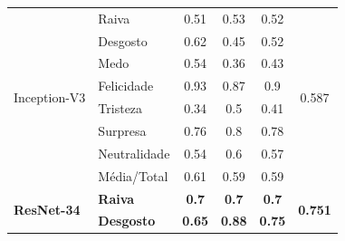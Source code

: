 \begin{table}[]
\begin{tabular}{llcccc}
\multirow{8}{*}{Inception-V3}     & Raiva                 & 0.51                                  & 0.53                                   & 0.52                                  & \multirow{8}{*}{0.587}                \\
                                       & Desgosto              & 0.62                                  & 0.45                                   & 0.52                                  &                                       \\
                                       & Medo                  & 0.54                                  & 0.36                                   & 0.43                                  &                                       \\
                                       & Felicidade            & 0.93                                  & 0.87                                   & 0.9                                   &                                       \\
                                       & Tristeza              & 0.34                                  & 0.5                                    & 0.41                                  &                                       \\
                                       & Surpresa              & 0.76                                  & 0.8                                    & 0.78                                  &                                       \\
                                       & Neutralidade          & 0.54                                  & 0.6                                    & 0.57                                  &                                       \\
                                       & Média/Total           & 0.61                                  & 0.59                                   & 0.59                                  &                                       \\ \hline
\multirow{8}{*}{\textbf{ResNet-34}} & \textbf{Raiva}        & \textbf{0.7}                          & \textbf{0.7}                           & \textbf{0.7}                          & \multirow{8}{*}{\textbf{0.751}}       \\
                                       & \textbf{Desgosto}     & \textbf{0.65}                         & \textbf{0.88}                          & \textbf{0.75}                         &                                       \\

\end{tabular}
\end{table}
